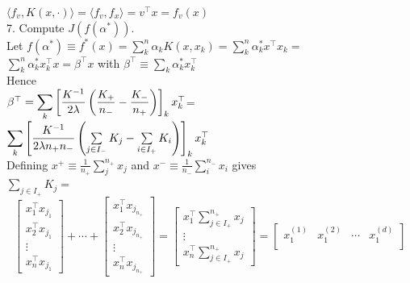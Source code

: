 \documentclass[18pt]{article}
\begin{document}
\begin{flushleft}
$\langle f_v,K(x,\cdot) \rangle=\langle f_v,f_x \rangle=v^{\top}x=f_v(x)$\\
\vspace{.4cm}
7. Compute $J(f(\alpha^*))$.\\
\vspace{.4cm}
Let $f(\alpha^*) \equiv f^*(x)=\sum\limits_k^n \alpha_k K(x,x_k)=\sum\limits_k^n \alpha_k^* x^{\top}x_k=$\\
$\sum\limits_k^n \alpha_k^* x_k^{\top}x=\beta^{\top}x$ with $\beta^{\top} \equiv \sum\limits_k \alpha_k^* x_k^{\top}$\\
\vspace{.4cm}
Hence\\
\vspace{.4cm}
$\beta^{\top}=\mathlarger\sum\limits_{k} \left[ \dfrac{K^{-1}}{2 \lambda}\left(\dfrac{K_+}{n_{-}}-\dfrac{K_-}{n_{+}}\right)\right]_k x_k^{\top}$=\\
$\mathlarger\sum\limits_{k} \left[ \dfrac{K^{-1}}{2 \lambda n_+ n_-}\left(\sum\limits_{j \in I_-} K_j-\sum\limits_{i \in I_+} K_i\right)\right]_k x^{\top}_k$\\
\vspace{.4cm}
Defining $x^+ \equiv \frac{1}{n_+} \sum_j^{n_+} x_j$ and $x^- \equiv \frac{1}{n_-} \sum_i^{n_-} x_i$ gives\\
$\sum\limits_{j \in I_+} K_j=$\\
\vspace{.4cm}
$$
    \begin{bmatrix}
        x_{1}^{\top}x_{j_1}\\x_{2}^{\top} x_{j_1}\\ \vdots \\ x_{n}^{\top} x_{j_1}
    \end{bmatrix}
    +\cdots+
    \begin{bmatrix}
        x_{1}^{\top} x_{j_{n_+}}\\x_{2}^{\top} x_{j_{n_+}}\\ \vdots \\ x_{n}^{\top} x_{j_{n_+}}
    \end{bmatrix}
    =
    \begin{bmatrix}
        x_{1}^{\top} \sum \limits_{j \in I_+}^{n_+} x_{j} \\ \vdots\\ x_{n}^{\top}\sum\limits_{j \in I_+}^{n_+} x_{j}
    \end{bmatrix} =
    \begin{bmatrix}
        x_1^{(1)} & x_1^{(2)}& \cdots &x_1^{(d)}\\

\end{bmatrix}$$
\end{flushleft}
\end{document}
